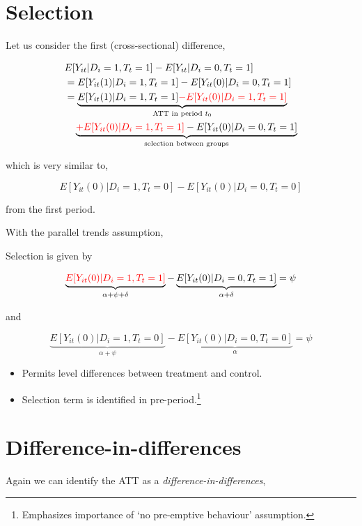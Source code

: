 \documentclass[
  letterpaper,
  DIV=11,
  numbers=noendperiod]{scrreprt}
\providecommand{\tightlist}{%
  \setlength{\itemsep}{0pt}\setlength{\parskip}{0pt}}\usepackage{longtable,booktabs,array}
\theoremstyle{definition}
\theoremstyle{remark}
\begin{document}
\hypertarget{selection-1}{%
\section{Selection}\label{selection-1}}

Let us consider the first (cross-sectional) difference,

\[
\begin{aligned}
&E[Y_{it}|D_i=1,T_t=1] - E[Y_{it}|D_i=0,T_t=1] \\
&= E[Y_{it}(1)|D_i=1,T_t=1] - E[Y_{it}(0)|D_i=0,T_t=1] \\
&= \underbrace{E[Y_{it}(1)|D_i=1,T_t=1] \textcolor{red}{- E[Y_{it}(0)|D_i=1,T_t=1]}}_{\text{ATT in period } t_0} \\
&\quad \underbrace{\textcolor{red}{+ E[Y_{it}(0)|D_i=1,T_t=1]} - E[Y_{it}(0)|D_i=0,T_t=1]}_{\text{selection between groups}}
\end{aligned}
\]

which is very similar to,

\[
E[Y_{it}(0)|D_i=1,T_t=0] - E[Y_{it}(0)|D_i=0,T_t=0]
\]

from the first period.

With the parallel trends assumption,

Selection is given by

\[
\underbrace{\textcolor{red}{E[Y_{it}(0)|D_i=1,T_t=1]}}_{\alpha + \psi + \delta} - \underbrace{E[Y_{it}(0)|D_i=0,T_t=1]}_{\alpha + \delta} = \psi
\]

and

\[
\underbrace{E[Y_{it}(0)|D_i=1,T_t=0]}_{\alpha + \psi} - \underbrace{E[Y_{it}(0)|D_i=0,T_t=0]}_{\alpha} = \psi
\]

\begin{itemize}
\tightlist
\item
  Permits level differences between treatment and control.
\item
  Selection term is identified in pre-period.\footnote{Emphasizes
    importance of `no pre-emptive behaviour' assumption.}
\end{itemize}

\hypertarget{difference-in-differences}{%
\section{Difference-in-differences}\label{difference-in-differences}}

Again we can identify the ATT as a \emph{difference-in-differences},
\end{document}
